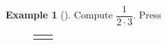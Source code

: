\documentclass[10pt,]{book}
\theoremstyle{plain}
\theoremstyle{definition}
\theoremstyle{definition}
\newtheorem{example}[theorem]{Example}
\theoremstyle{definition}
\numberwithin{equation}{part}
\newlength{\panelmax}
\begin{document}
\begin{example}[]\label{example-98}
Compute \(\dfrac{1}{2\cdot 3} \). Press%
{%
\setlength{\panelmax}{0pt}
\newsavebox{\panelboxAIAp}
\newlength{\phAIAp}\setlength{\phAIAp}{\ht\panelboxAIAp+\dp\panelboxAIAp}
\settototalheight{\phAIAp}{\usebox{\panelboxAIAp}}
\setlength{\panelmax}{\maxof{\panelmax}{\phAIAp}}
\newsavebox{\panelboxAIBp}
\newlength{\phAIBp}\setlength{\phAIBp}{\ht\panelboxAIBp+\dp\panelboxAIBp}
\settototalheight{\phAIBp}{\usebox{\panelboxAIBp}}
\setlength{\panelmax}{\maxof{\panelmax}{\phAIBp}}
\leavevmode%
\setlength{\tabcolsep}{0.025\textwidth}
\begin{figure}
\begin{tabular}{@{}*{2}{c}@{}}
\begin{minipage}[c][\panelmax][t]{0.6\textwidth}\usebox{\panelboxAIAp}\end{minipage}&
\begin{minipage}[c][\panelmax][t]{0.35\textwidth}\usebox{\panelboxAIBp}\end{minipage}\end{tabular}
\end{figure}
}%
\end{example}
\end{document}
